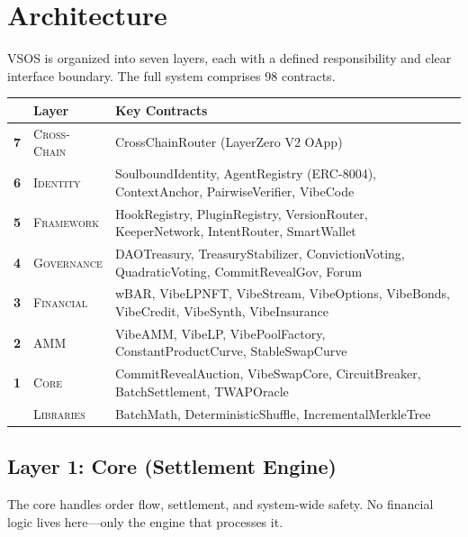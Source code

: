 \documentclass[9pt, letterpaper]{article}
\begin{document}

\section{Architecture}

VSOS is organized into seven layers, each with a defined responsibility and clear interface boundary. The full system comprises 98 contracts.

\vspace{0.2em}
{\small
\renewcommand{\arraystretch}{1.1}
\begin{tabularx}{\textwidth}{@{} c l X @{}}
\toprule
& \textbf{Layer} & \textbf{Key Contracts} \\
\midrule
\textsf{\textbf{7}} & \textsc{Cross-Chain} & CrossChainRouter (LayerZero V2 OApp) \\
\textsf{\textbf{6}} & \textsc{Identity} & SoulboundIdentity, AgentRegistry (ERC-8004), ContextAnchor, PairwiseVerifier, VibeCode \\
\textsf{\textbf{5}} & \textsc{Framework} & HookRegistry, PluginRegistry, VersionRouter, KeeperNetwork, IntentRouter, SmartWallet \\
\textsf{\textbf{4}} & \textsc{Governance} & DAOTreasury, TreasuryStabilizer, ConvictionVoting, QuadraticVoting, CommitRevealGov, Forum \\
\textsf{\textbf{3}} & \textsc{Financial} & wBAR, VibeLPNFT, VibeStream, VibeOptions, VibeBonds, VibeCredit, VibeSynth, VibeInsurance \\
\textsf{\textbf{2}} & \textsc{AMM} & VibeAMM, VibeLP, VibePoolFactory, ConstantProductCurve, StableSwapCurve \\
\textsf{\textbf{1}} & \textsc{Core} & CommitRevealAuction, VibeSwapCore, CircuitBreaker, BatchSettlement, TWAPOracle \\
\midrule
& \textsc{Libraries} & BatchMath, DeterministicShuffle, IncrementalMerkleTree \\
\bottomrule
\end{tabularx}
}

\subsection{Layer 1: Core (Settlement Engine)}

The core handles order flow, settlement, and system-wide safety. No financial logic lives here---only the engine that processes it.
\end{document}
